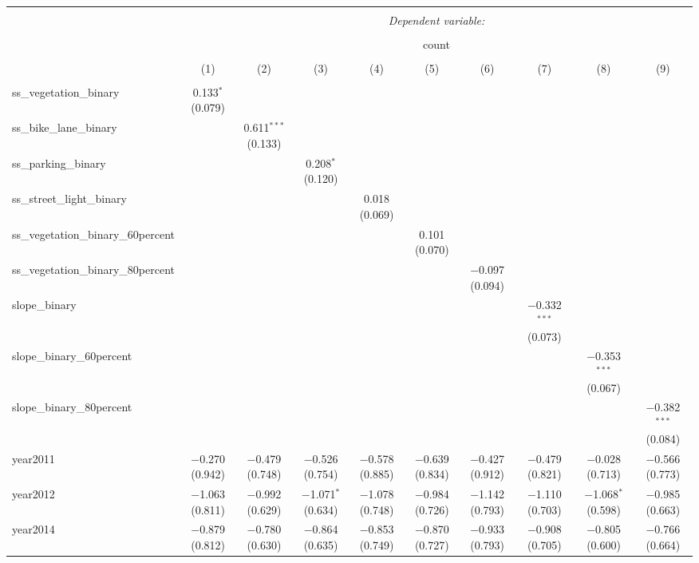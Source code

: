 
\begin{table}[!htbp] \centering 
  \caption{} 
  \label{} 
\small 
\begin{tabular}{@{\extracolsep{1pt}}lccccccccc} 
\\[-1.8ex]\hline 
\hline \\[-1.8ex] 
 & \multicolumn{9}{c}{\textit{Dependent variable:}} \\ 
\cline{2-10} 
\\[-1.8ex] & \multicolumn{9}{c}{count} \\ 
\\[-1.8ex] & (1) & (2) & (3) & (4) & (5) & (6) & (7) & (8) & (9)\\ 
\hline \\[-1.8ex] 
 ss\_vegetation\_binary & 0.133$^{*}$ (0.079) &  &  &  &  &  &  &  &  \\ 
  ss\_bike\_lane\_binary &  & 0.611$^{***}$ (0.133) &  &  &  &  &  &  &  \\ 
  ss\_parking\_binary &  &  & 0.208$^{*}$ (0.120) &  &  &  &  &  &  \\ 
  ss\_street\_light\_binary &  &  &  & 0.018 (0.069) &  &  &  &  &  \\ 
  ss\_vegetation\_binary\_60percent &  &  &  &  & 0.101 (0.070) &  &  &  &  \\ 
  ss\_vegetation\_binary\_80percent &  &  &  &  &  & $-$0.097 (0.094) &  &  &  \\ 
  slope\_binary &  &  &  &  &  &  & $-$0.332$^{***}$ (0.073) &  &  \\ 
  slope\_binary\_60percent &  &  &  &  &  &  &  & $-$0.353$^{***}$ (0.067) &  \\ 
  slope\_binary\_80percent &  &  &  &  &  &  &  &  & $-$0.382$^{***}$ (0.084) \\ 
  year2011 & $-$0.270 (0.942) & $-$0.479 (0.748) & $-$0.526 (0.754) & $-$0.578 (0.885) & $-$0.639 (0.834) & $-$0.427 (0.912) & $-$0.479 (0.821) & $-$0.028 (0.713) & $-$0.566 (0.773) \\ 
  year2012 & $-$1.063 (0.811) & $-$0.992 (0.629) & $-$1.071$^{*}$ (0.634) & $-$1.078 (0.748) & $-$0.984 (0.726) & $-$1.142 (0.793) & $-$1.110 (0.703) & $-$1.068$^{*}$ (0.598) & $-$0.985 (0.663) \\ 
  year2014 & $-$0.879 (0.812) & $-$0.780 (0.630) & $-$0.864 (0.635) & $-$0.853 (0.749) & $-$0.870 (0.727) & $-$0.933 (0.793) & $-$0.908 (0.705) & $-$0.805 (0.600) & $-$0.766 (0.664) \\ 

\end{tabular}
\end{table}
